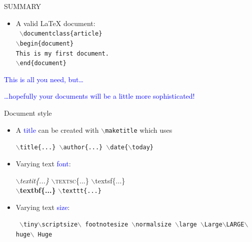 \documentclass{beamer}
\newcommand{\bc}{\begin{center}}
\newcommand{\ec}{\end{center}}
\newcommand{\lx}{{\LaTeX} }
\newcommand{\bs}{$\backslash$}
\def\mynormal{\vspace*{-0.5cm}}
\begin{document}
\begin{frame}{SUMMARY}
\mynormal
\medskip
\begin{itemize}
\item A valid \lx  document:\\
\medskip
{\tt
$\backslash$documentclass\{article\}\\
$\backslash$begin\{document\}\\
This is my first document.\\
$\backslash$end\{document\}\\}
\end{itemize}
\bigskip
\pause
\bc
\textcolor{blue}{This is all you need, but\ldots}
\ec
\pause
\bc
\textcolor{blue}{\ldots hopefully your documents will be a little more
sophisticated!}
\ec
\begin{flushright}
\end{flushright}
\end{frame}
\begin{frame}{Document style}
\mynormal
\begin{itemize}
\item A \textcolor{blue}{title} can be created with
{\tt $\backslash$maketitle} which uses
\bc
{\tt\bs title\{...\}\qquad
\bs author\{...\}\qquad
\bs date\{\bs today\} }
\ec
\medskip
\pause
\item Varying text \textcolor{blue}{font}:
\bc
\textit{\bs textit\{...\}}\qquad
\textsc{\bs textsc\{...\}}\qquad 
\textsf{\bs textsf\{...\}}\\
\textbf{\bs textbf\{...\}}\qquad 
\texttt{\bs texttt\{...\}}
\ec
\medskip
\pause
\item Varying text \textcolor{blue}{size}:
\bc{\tt
\tiny \bs tiny\qquad \scriptsize\bs scriptsize\qquad \footnotesize\bs 
footnotesize\qquad 
\normalsize \bs normalsize \qquad
\large \bs large\qquad 
\Large \bs Large\qquad \LARGE \bs LARGE\qquad \huge \bs huge\qquad \Huge\bs 
Huge}
\ec
\end{itemize}
\end{frame}
\end{document}
